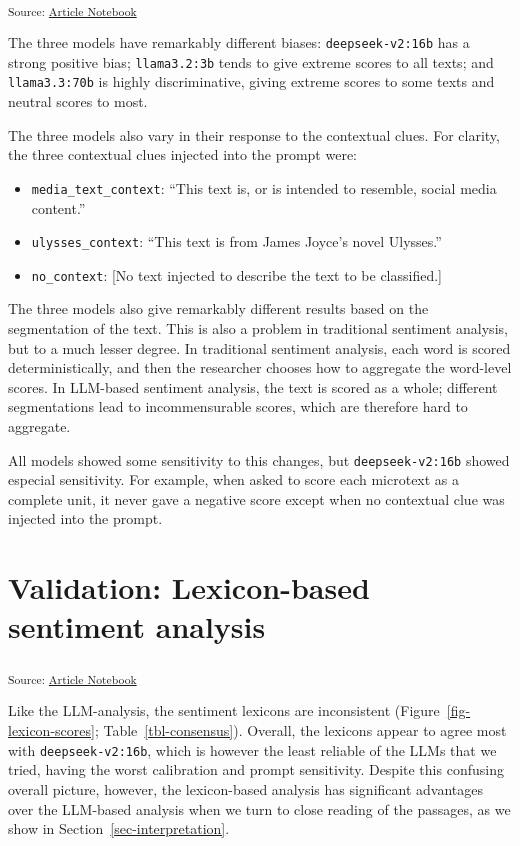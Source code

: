 \documentclass[
  letterpaper,
  DIV=11,
  numbers=noendperiod]{scrartcl}
\providecommand{\tightlist}{%
  \setlength{\itemsep}{0pt}\setlength{\parskip}{0pt}}
\begin{document}
\textsubscript{Source:
\href{https://uom-digital-studies.github.io/aeolus-microtexts/index.qmd.html}{Article
Notebook}}

The three models have remarkably different biases:
\texttt{deepseek-v2:16b} has a strong positive bias;
\texttt{llama3.2:3b} tends to give extreme scores to all texts; and
\texttt{llama3.3:70b} is highly discriminative, giving extreme scores to
some texts and neutral scores to most.

The three models also vary in their response to the contextual clues.
For clarity, the three contextual clues injected into the prompt were:

\begin{itemize}
\tightlist
\item
  \texttt{media\_text\_context}: ``This text is, or is intended to
  resemble, social media content.''
\item
  \texttt{ulysses\_context}: ``This text is from James Joyce's novel
  Ulysses.''
\item
  \texttt{no\_context}: {[}No text injected to describe the text to be
  classified.{]}
\end{itemize}

The three models also give remarkably different results based on the
segmentation of the text. This is also a problem in traditional
sentiment analysis, but to a much lesser degree. In traditional
sentiment analysis, each word is scored deterministically, and then the
researcher chooses how to aggregate the word-level scores. In LLM-based
sentiment analysis, the text is scored as a whole; different
segmentations lead to incommensurable scores, which are therefore hard
to aggregate.

All models showed some sensitivity to this changes, but
\texttt{deepseek-v2:16b} showed especial sensitivity. For example, when
asked to score each microtext as a complete unit, it never gave a
negative score except when no contextual clue was injected into the
prompt.

\section{Validation: Lexicon-based sentiment
analysis}\label{sec-validation}

\textsubscript{Source:
\href{https://uom-digital-studies.github.io/aeolus-microtexts/index.qmd.html}{Article
Notebook}}

Like the LLM-analysis, the sentiment lexicons are inconsistent
(Figure~\ref{fig-lexicon-scores}; Table~\ref{tbl-consensus}). Overall,
the lexicons appear to agree most with \texttt{deepseek-v2:16b}, which
is however the least reliable of the LLMs that we tried, having the
worst calibration and prompt sensitivity. Despite this confusing overall
picture, however, the lexicon-based analysis has significant advantages
over the LLM-based analysis when we turn to close reading of the
passages, as we show in Section~\ref{sec-interpretation}.
\end{document}
